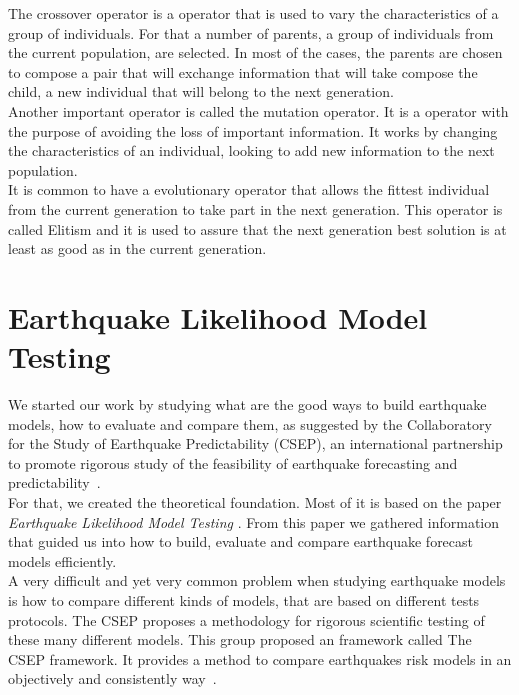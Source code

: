 The crossover operator is a operator that is used to vary the characteristics of a group of individuals. For that a number of parents, a group of individuals from the current population, are selected. In most of the cases, the parents are chosen to compose a pair that will exchange information that will take compose the child, a new individual that will belong to the next generation.\\

Another important operator is called the mutation operator. It is a operator with the purpose of avoiding the loss of important information. It works by changing the characteristics of an individual, looking to add new information to the next population.\\

It is common to have a evolutionary operator that allows the fittest individual from the current generation to take part in the next generation. This operator is called Elitism and it is used to assure that the next generation best solution is at least as good as in the current generation.\\


\section{Earthquake Likelihood Model Testing}

We started our work by studying what are the good ways to build earthquake models, how to evaluate and compare them, as suggested by the Collaboratory for the Study of Earthquake Predictability (CSEP), an international partnership to promote rigorous study of the feasibility of earthquake forecasting and predictability~\cite{ecta14}.\\

For that, we created the theoretical foundation. Most of it is based on the paper {\it Earthquake Likelihood Model Testing} \cite{schorlemmer2007earthquake}. From this paper we gathered information that guided us into how to build, evaluate and compare earthquake forecast models efficiently.\\

A very difficult and yet very common problem when studying earthquake models is how to compare different kinds of models, that are based on different tests protocols. The CSEP proposes a methodology for rigorous scientific testing of these many different models. This group proposed an framework called The CSEP framework. It provides a method to compare earthquakes risk models in an objectively and consistently way~\cite{ecta14}.\\

